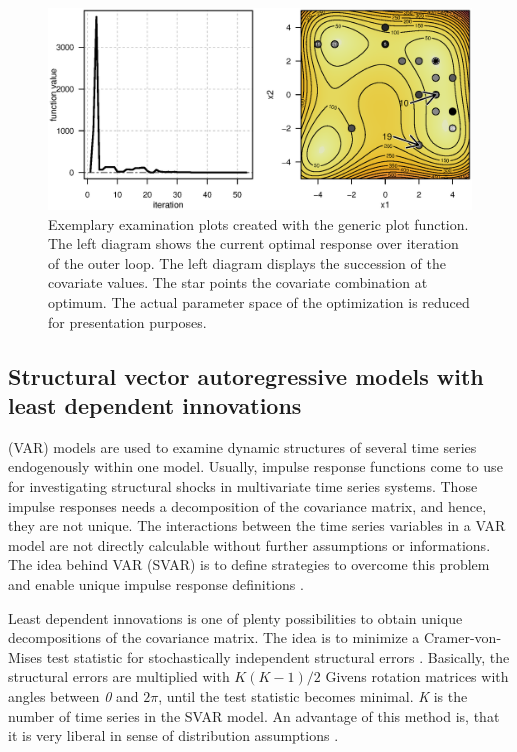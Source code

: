 \begin{figure}[htbp]
\centering
\includegraphics[width=1.025\textwidth]{Fig/fig2-ex2-plot.eps}
\caption{Exemplary examination plots created with the generic plot function. The left diagram shows the current optimal response over iteration of the outer loop. The left diagram displays the succession of the covariate values. The star points the covariate combination at optimum. The actual parameter space of the optimization is reduced for presentation purposes.}
\label{fig:fig2}
\end{figure}

\subsection{Structural vector autoregressive models with least dependent innovations}
 (VAR) models are used to examine dynamic structures of several time series endogenously within one model. Usually, impulse response functions come to use for investigating structural shocks in multivariate time series systems. Those impulse responses needs a decomposition of the covariance matrix, and hence, they are not unique. The interactions between the time series variables in a VAR model are not directly calculable without further assumptions or informations. The idea behind  VAR (SVAR) is to define strategies to overcome this problem and enable unique impulse response definitions \citep{lutkepohl_2006}.

Least dependent innovations is one of plenty possibilities to obtain unique decompositions of the covariance matrix. The idea is to minimize a Cramer-von-Mises test statistic for stochastically independent structural errors \citep{genest_2007}. Basically, the structural errors are multiplied with $K(K-1)/2$ Givens rotation matrices with angles between \textit{0} and $2\pi$, until the test statistic becomes minimal. \textit{K} is the number of time series in the SVAR model. An advantage of this method is, that it is very liberal in sense of distribution assumptions \citep{herwartz_2014}.

